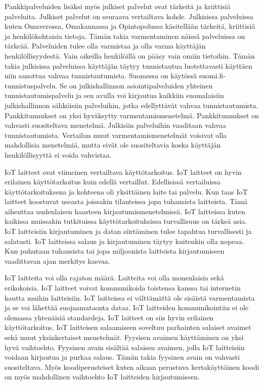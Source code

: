 Pankkipalveluiden lisäksi myös julkiset palvelut ovat tärkeitä ja kriittisiä palveluita. Julkiset palvelut on seuraava vertailtava kohde. Julkisissa palveluissa kuten Omaverossa, Omakannassa ja Opintopolussa käsitellään tärkeitä, kriittisiä ja henkilökohtaisia tietoja. Tämän takia varmentaminen näissä palveluissa on tärkeää. Palveluiden tulee olla varmistaa ja olla varma käyttäjän henkilöllisyydestä. Vain oikeilla henkilöillä on pääsy vain omiin tietoihin. Tämän takia julkisissa palveluissa käyttäjän täytyy tunnistautua luotettavasti käyttäen niin sanottua vahvaa tunnistautumista. Suomessa on käytössä suomi.fi-tunnistuspalvelu. Se on julkishallinnon asiointipalveluiden yhteinen tunnistautumispalvelu ja sen avulla voi kirjautua kaikkiin suomalaisiin julkishallinnon sähköisiin palveluihin, jotka edellyttävät vahvaa tunnistautumista. Pankkitunnukset on yksi hyväksytty varmentamismenetelmä. Pankkitunnukset on vahvasti suositeltava menetelmä. \citep{suomi.fi} 
Julkisiin palveluihin vaaditaan vahvaa tunnistautumista. Vertailun muut varmentamismenetelmät voisivat olla mahdollisia menetelmiä, mutta eivät ole suositeltavia koska käyttäjän henkilöllisyyttä ei voida vahvistaa.



IoT laitteet ovat viimeinen vertailtava käyttötarkoitus. IoT laitteet on hyvin erilainen käyttötarkoitus kuin edellä vertaillut. Edellisissä vertailuissa käyttötarkoituksena ja kohteena oli yksittäinen laite tai palvelu. Kun taas IoT laitteet koostuvat useasta joissakin tilanteissa jopa tuhansista laitteista. Tämä aiheuttaa uudenlaisen haasteen kirjautumismenetelmissä.
IoT laitteissa kuten kaikissa muissakin tutkituissa käyttötarkoituksissa turvallisuus on tärkeä asia. IoT laitteisiin kirjautuminen ja datan siirtäminen tulee tapahtua turvallisesti ja salatusti. IoT laitteissa salaus ja kirjautuminen täytyy kuitenkin olla nopeaa. Kun puhutaan tuhansista tai jopa miljoonista laitteista kirjautumiseen vaadittavan ajan merkitys kasvaa.

IoT laitteita voi olla rajaton määrä. Laitteita voi olla monenlaisia sekä erikokoisia. IoT laitteet voivat kommunikoida toistensa kanssa tai internetin kautta muihin laitteisiin. IoT laitteissa ei välttämättä ole sisäistä varmentamista ja se voi lähettää suojaamataonta dataa. IoT laitteiden kommunikointiin ei ole olemassa yhtenäisiä standardeja. IoT laitteet on siis hyvin erilainen käyttötarkoitus. IoT laitteisen salaamiseen soveltuu parhainten salaiset avaimet sekä muut yksinkertaiset menetelmät. Fyysisen avaimen käyttäminen on yksi hyvä vaihtoehto. Fyysinen avain sisältää salaisen avaimen, jolla IoT laitteisiin voidaan kirjautua ja purkaa salaus. Tämän takia fyysinen avain on vahvasti suositeltava. Myös koodiperusteiset kuten aikaan perustuva kertakäyttöinen koodi on myös mahdollinen vaihtoehto IoT laitteiden kirjautumiseen.

